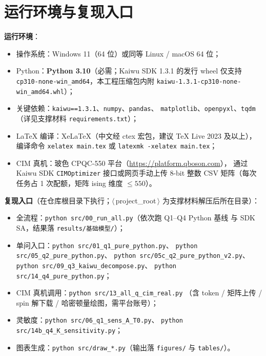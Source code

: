 \documentclass[UTF8,12pt,a4paper]{ctexart}
\begin{document}
\section{运行环境与复现入口}
\label{app:env}

\textbf{运行环境}：

\begin{itemize}[leftmargin=2em,itemsep=0.2ex]
  \item 操作系统：Windows 11（64 位）或同等 Linux / macOS 64 位；
  \item Python：\textbf{Python 3.10}（必需；Kaiwu SDK 1.3.1 的发行 wheel 仅支持
        \texttt{cp310-none-win\_amd64}，本工程压缩包内附 \texttt{kaiwu-1.3.1-cp310-none-win\_amd64.whl}）；
  \item 关键依赖：\texttt{kaiwu==1.3.1}、\texttt{numpy}、\texttt{pandas}、
        \texttt{matplotlib}、\texttt{openpyxl}、\texttt{tqdm}（详见支撑材料 \texttt{requirements.txt}）；
  \item LaTeX 编译：XeLaTeX（中文经 ctex 宏包，建议 TeX Live 2023 及以上），
        编译命令 \texttt{xelatex main.tex} 或 \texttt{latexmk -xelatex main.tex}；
  \item CIM 真机：玻色 CPQC-550 平台（\url{https://platform.qboson.com}），
        通过 Kaiwu SDK \texttt{CIMOptimizer} 接口或网页手动上传 8-bit 整数 CSV
        矩阵（每次任务占 1 次配额，矩阵 ising 维度 $\le 550$）。
\end{itemize}

\textbf{复现入口}（在仓库根目录下执行；$\langle$\,project\_root\,$\rangle$ 为支撑材料解压后所在目录）：

\begin{itemize}[leftmargin=2em,itemsep=0.2ex]
  \item 全流程：\texttt{python src/00\_run\_all.py}（依次跑 Q1--Q4 Python 基线
        与 SDK SA，结果落 \texttt{results/基础模型/}）；
  \item 单问入口：\texttt{python src/01\_q1\_pure\_python.py}、
        \texttt{python src/05\_q2\_pure\_python.py}、
        \texttt{python src/05c\_q2\_pure\_python\_v2.py}、
        \texttt{python src/09\_q3\_kaiwu\_decompose.py}、
        \texttt{python src/14\_q4\_pure\_python.py}；
  \item CIM 真机调用：\texttt{python src/13\_all\_q\_cim\_real.py}
        （含 token / 矩阵上传 / spin 解下载 / 哈密顿量绘图，需平台账号）；
  \item 灵敏度：\texttt{python src/06\_q1\_sens\_A\_T0.py}、
        \texttt{python src/14b\_q4\_K\_sensitivity.py}；
  \item 图表生成：\texttt{python src/draw\_*.py}（输出落 \texttt{figures/} 与 \texttt{tables/}）。
\end{itemize}
\end{document}
